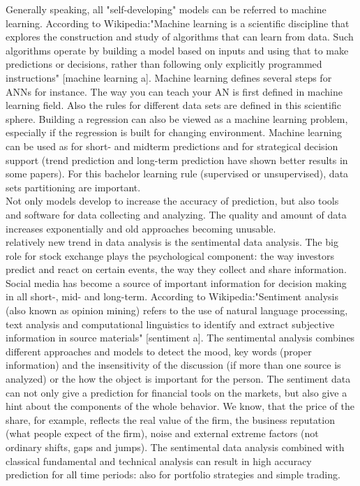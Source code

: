 \documentclass[12pt, a4paper]{article}
\begin{document}
Generally speaking, all "self-developing" models can be referred to machine learning. According to Wikipedia:"Machine learning is a scientific discipline that explores the construction and study of algorithms that can learn from data. Such algorithms operate by building a model based on inputs and using that to make predictions or decisions, rather than following only explicitly programmed instructions" [machine learning a]. Machine learning defines several steps for ANNs for instance. The way you can teach your AN is first defined in machine learning field. Also the rules for different data sets are defined in this scientific sphere. Building a regression can also be viewed as a machine learning problem, especially if the regression is built for changing environment. Machine learning can be used as for short- and midterm predictions and for strategical decision support (trend prediction and long-term prediction have shown better results in some papers). For this bachelor learning rule (supervised or unsupervised), data sets partitioning are important.  \\
Not only models develop to increase the accuracy of prediction, but also tools and software for data collecting and analyzing. The quality and amount of data increases exponentially and old approaches becoming unusable.\\
relatively new trend in data analysis is the sentimental data analysis. The big role for stock exchange plays the psychological component: the way investors predict and react on certain events, the way they collect and share information. Social media has become a source of important information for decision making in all short-, mid- and long-term. According to Wikipedia:"Sentiment analysis (also known as opinion mining) refers to the use of natural language processing, text analysis and computational linguistics to identify and extract subjective information in source materials" [sentiment a]. The sentimental analysis combines different approaches and models to detect the mood, key words (proper information) and the insensitivity of the discussion (if more than one source is analyzed) or the how the object is important for the person. The sentiment data can not only give a prediction for financial tools on the markets, but also give a hint about the components of the whole behavior. We know, that the price of the share, for example, reflects the real value of the firm, the business reputation (what people expect of the firm), noise and external extreme factors (not ordinary shifts, gaps and jumps). The sentimental data analysis combined with classical fundamental and technical analysis can result in high accuracy prediction for all time periods: also for portfolio strategies and simple trading.
\end{document}
